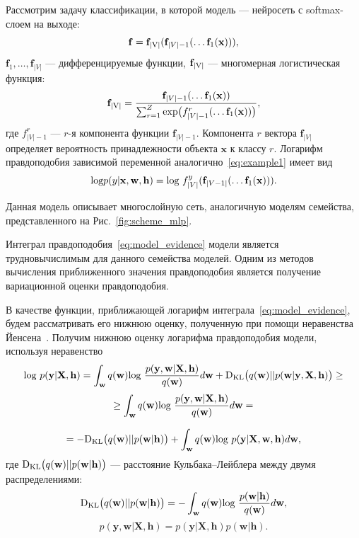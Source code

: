 \begin{example}
Рассмотрим задачу классификации, в которой модель --- нейросеть с softmax-слоем на выходе:
\[
\mathbf{f} = \mathbf{f}_\textnormal{|V|}(\mathbf{f}_{|V|-1}(\dots \mathbf{f}_1(\mathbf{x}))),
\]
$\mathbf{f}_1, \dots, \mathbf{f}_{|V|}$ --- дифференцируемые функции, $\mathbf{f}_\textnormal{|V|}$ --- многомерная логистическая функция:
\[
	\mathbf{f}_\textnormal{|V|} = \frac{\mathbf{f}_{|V|-1}(\dots \mathbf{f}_1(\mathbf{x}))}{\sum_{r=1}^Z \textnormal{exp}\bigl( {f}^{r}_{|V|-1}(\dots \mathbf{f}_1(\mathbf{x})) \bigr)},
\]
где ${f}_{|V|-1}^{r}$ --- $r$-я компонента функции $\mathbf{f}_{|V|-1}$. Компонента $r$ вектора $\mathbf{f}_{|V|}$ определяет вероятность принадлежности объекта $\mathbf{x}$ к классу $r$. Логарифм правдоподобия зависимой переменной аналогично~\eqref{eq:example1} имеет вид
\[
	\textnormal{log} p({y}|\mathbf{x}, \mathbf{w}, \mathbf{h}) =  \textnormal{log}~{f}^{y}_{|V|} (\mathbf{f}_{|V-1|}(\dots \mathbf{f}_1(\mathbf{x}))).
\]

Данная модель описывает многослойную сеть, аналогичную моделям семейства, представленного на Рис.~\ref{fig:scheme_mlp}.
\end{example}

Интеграл правдоподобия~\eqref{eq:model_evidence} модели является трудновычислимым для данного семейства моделей. Одним из методов вычисления приближенного значения правдоподобия является получение вариационной оценки правдоподобия.  


{В качестве функции, приближающей логарифм интеграла~\eqref{eq:model_evidence}, будем рассматривать его нижнюю оценку, полученную при помощи неравенства Йенсена~\cite{Bishop}. Получим нижнюю оценку логарифма правдоподобия модели, используя неравенство}
\begin{equation} 
\label{eq:var_elbo}
\textnormal{log}~p(\mathbf{y}|\mathbf{X},\mathbf{h})  = \int_{\mathbf{w}} q(\mathbf{w})\textnormal{log}~\frac{p(\mathbf{y},\mathbf{w}|\mathbf{X},\mathbf{h})}{q(\mathbf{w})}d\mathbf{w} + \textnormal{D}_\textnormal{KL}  \bigl(q(\mathbf{w})||p(\mathbf{w}|\mathbf{y}, \mathbf{X}, \mathbf{h})\bigr) \geq	
\end{equation} 
$$
\geq \int_{\mathbf{w}} q(\mathbf{w})\textnormal{log}~\frac{p(\mathbf{y},\mathbf{w}|\mathbf{X},\mathbf{h})}{q(\mathbf{w})}d\mathbf{w} =
$$

$$
= -\textnormal{D}_\textnormal{KL} \bigl(q(\mathbf{w})||p(\mathbf{w}|\mathbf{h})\bigr) + \int_{\mathbf{w}} q(\mathbf{w})\textnormal{log}~{p(\mathbf{y}|\mathbf{X},\mathbf{w},\mathbf{h})} d \mathbf{w},
$$
где $\textnormal{D}_\textnormal{KL}\bigl(q(\mathbf{w})||p(\mathbf{w} |\mathbf{h})\bigr)$ --- расстояние Кульбака--Лейблера между двумя распределениями: $$\textnormal{D}_\textnormal{KL}\bigl(q(\mathbf{w})||p(\mathbf{w} |\mathbf{h})\bigr) = -\int_{\mathbf{w}} q(\mathbf{w})\textnormal{log}~\frac{p(\mathbf{w} | \mathbf{h})}{q(\mathbf{w})}d\mathbf{w},$$
$$
p(\mathbf{y},\mathbf{w}|\mathbf{X},\mathbf{h}) = p(\mathbf{y}|\mathbf{X},\mathbf{h})p(\mathbf{w}|\mathbf{h}).
$$

